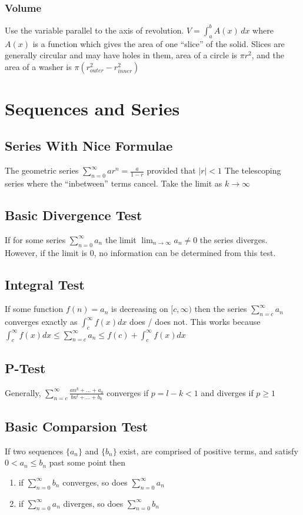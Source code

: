 \documentclass[10pt,landscape,letterpaper]{cheatsheet}
\begin{document}
\subsubsection*{Volume} Use the variable parallel to the axis of revolution.
$V = \int_{a}^{b} A(x) \,dx$ where $A(x)$ is a function which gives the area
of one ``slice'' of the solid. Slices are generally circular and may have holes in them, area
of a circle is $\pi r^2$, and the area of a washer is $\pi (r_{outer}^2-r_{inner}^2)$

\section*{Sequences and Series}
\subsection*{Series With Nice Formulae}
The geometric series $\sum_{n=0}^{\infty}ar^n=\frac{a}{1-r}$ provided that $|r|<1$
The telescoping series where the ``inbetween'' terms cancel. Take the limit as $k\to\infty$
\subsection{Basic Divergence Test}
If for some series $\sum_{n=0}^{\infty}a_n$ the limit $\lim_{n \to \infty} a_n \neq 0$ the series diverges.
However, if the limit is 0, no information can be determined from this test.
\subsection*{Integral Test}
If some function $f(n)=a_n$ is decreasing on $[c,\infty)$ then the
series $\sum_{n=c}^{\infty}a_n$ converges exactly as $\int_{c}^{\infty}f(x)dx$ does / does not. This works because
$\int_{c}^{\infty}f(x)dx\leq\sum_{n=c}^{\infty}a_n\leq f(c)+\int_{c}^{\infty}f(x)dx$
\subsection*{P-Test}
Generally, $\sum_{n=c}^{\infty}\frac{an^k+\dots+a_0}{bn^l+\dots+b_0}$ converges if $p=l-k<1$ and diverges if $p\geq 1$
\subsection*{Basic Comparsion Test}
If two sequences $\{a_n\}$ and $\{b_n\}$ exist, are comprised of positive terms, and satisfy $0<a_n\leq b_n$
past some point then
\begin{enumerate}[label=(\alph*)]
        \item if $\sum_{n=0}^{\infty}b_n$ converges, so does $\sum_{n=0}^{\infty}a_n$
        \item if $\sum_{n=0}^{\infty}a_n$ diverges, so does $\sum_{n=0}^{\infty}b_n$
\end{enumerate}
\end{document}
